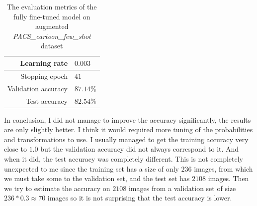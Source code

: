 \documentclass[a4paper,11pt]{article}
\begin{document}
\begin{table}[ht]
    \centering
    \begin{tabular}{ | r | l | }
        \hline
        Learning rate       & $0.003$   \\
        \hline
        Stopping epoch      & $41$      \\
        \hline
        Validation accuracy & $87.14\%$ \\
        \hline
        Test accuracy       & $82.54\%$ \\
        \hline
    \end{tabular}
    \caption{The evaluation metrics of the fully fine-tuned model on augmented \textit{PACS\_cartoon\_few\_shot} dataset}
    \label{table:few_shot_augmented_acc}
\end{table}

In conclusion, I did not manage to improve the accuracy significantly, the results are only slightly better.
I think it would required more tuning of the probabilities and transformations to use.
I usually managed to get the training accuracy very close to $1.0$ but the validation accuracy did not always correspond to it.
And when it did, the test accuracy was completely different.
This is not completely unexpected to me since the training set has a size of only $236$ images, from which we must take some to the validation set, and the test set has $2108$ images.
Then we try to estimate the accuracy on $2108$ images from a validation set of size $236 * 0.3 \approx 70$ images so it is not surprising that the test accuracy is lower.
\end{document}
